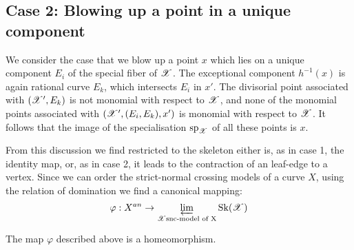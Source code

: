 \subsection*{Case 2: Blowing up a point in a unique component} We consider the case that we blow up a point $x$ which lies on a unique component $E_i$ of the special fiber of $\mathcal{X}$. The exceptional component $h^{-1}(x)$ is again rational curve $E_k$, which intersects $E_i$ in $x'$. The divisorial point associated with $(\mathcal{X}',E_k)$ is not monomial with respect to $\mathcal{X}$, and none of the monomial points associated with $(\mathcal{X}',(E_i,E_k),x')$ is monomial with respect to $\mathcal{X}$. It follows that the image of the specialisation $\operatorname{sp}_{\mathcal{X}}$ of all these points is $x$.

From this discussion we find 
restricted to the skeleton either is, as in case 1, the identity map, or, as in case 2, it leads to the contraction of an leaf-edge to a vertex. Since we can order the strict-normal crossing models of a curve $X$, using the relation of domination we find a canonical mapping:
\[\varphi:X^{an}\to \varprojlim_{\mathcal{X}\text{snc-model of X}}\operatorname{Sk}(\mathcal{X})\]

\begin{theorem}
The map $\varphi$ described above is a homeomorphism. 
\end{theorem}

